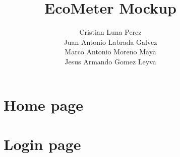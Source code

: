 \documentclass[12pt]{article}
\begin{document}
\title{EcoMeter Mockup}
\author{
    Cristian Luna Perez \\
    Juan Antonio Labrada Galvez \\
    Marco Antonio Moreno Maya \\
    Jesus Armando Gomez Leyva
}

\maketitle


\begin{figure}[p]
    \section{Home page}
    \centering
\end{figure}

\begin{figure}[p]
    \centering
\end{figure}

\begin{figure}[p]
    \centering
\end{figure}

\begin{figure}[p]
    \centering
\end{figure}

\begin{figure}[p]
    \centering
\end{figure}

\begin{figure}[p]
    \centering
\end{figure}

\begin{figure}[p]
    \section{Login page}
    \centering
\end{figure}

\begin{figure}[p]
    \centering
\end{figure}

\begin{figure}[p]
    \centering
\end{figure}
\end{document}
